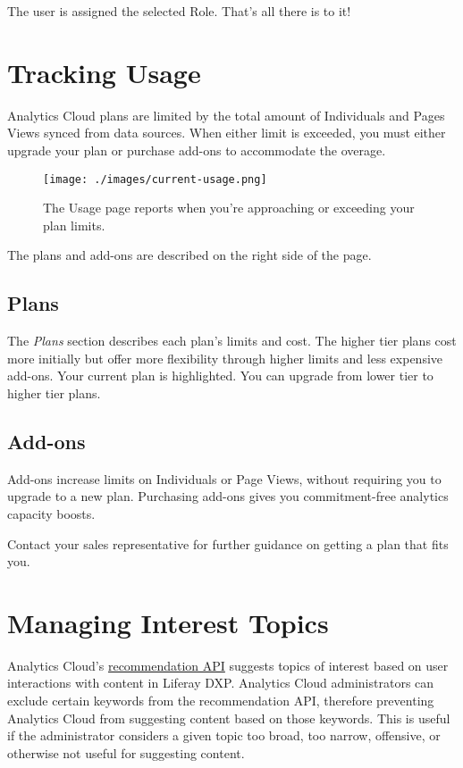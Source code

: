 The user is assigned the selected Role. That's all there is to it!

\section{Tracking Usage}\label{tracking-usage}

Analytics Cloud plans are limited by the total amount of Individuals and
Pages Views synced from data sources. When either limit is exceeded, you
must either upgrade your plan or purchase add-ons to accommodate the
overage.

\begin{figure}
\centering
\texttt{[image: ./images/current-usage.png]}
\caption{The Usage page reports when you're approaching or exceeding
your plan limits.}
\end{figure}

The plans and add-ons are described on the right side of the page.

\subsection{Plans}\label{plans}

The \emph{Plans} section describes each plan's limits and cost. The
higher tier plans cost more initially but offer more flexibility through
higher limits and less expensive add-ons. Your current plan is
highlighted. You can upgrade from lower tier to higher tier plans.

\subsection{Add-ons}\label{add-ons}

Add-ons increase limits on Individuals or Page Views, without requiring
you to upgrade to a new plan. Purchasing add-ons gives you
commitment-free analytics capacity boosts.

Contact your sales representative for further guidance on getting a plan
that fits you.

\section{Managing Interest Topics}\label{managing-interest-topics}

Analytics Cloud's
\href{https://github.com/liferay/liferay-docs/blob/7.1.x/discover/analytics-cloud/articles/04-analyzing-touchpoints/09-content-recommendation-api.markdown}{recommendation
API} suggests topics of interest based on user interactions with content
in Liferay DXP. Analytics Cloud administrators can exclude certain
keywords from the recommendation API, therefore preventing Analytics
Cloud from suggesting content based on those keywords. This is useful if
the administrator considers a given topic too broad, too narrow,
offensive, or otherwise not useful for suggesting content.

